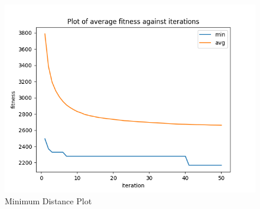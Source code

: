 \documentclass{article}
\begin{document}
\begin{figure}[H]
  \centering
  \includegraphics[width=1\linewidth]{images/min_n80-k10.png}
  \caption{Minimum Distance Plot}
\end{figure}
\end{document}
